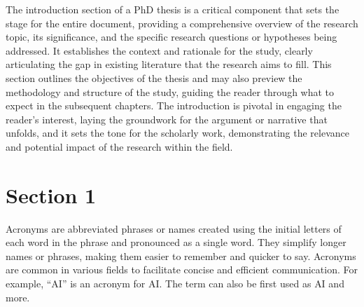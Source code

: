\clearpage
\label{chap:chap001}
\noindent

The introduction section of a PhD thesis is a critical component that sets the stage for the entire document, providing a comprehensive overview of the research topic, its significance, and the specific research questions or hypotheses being addressed.
It establishes the context and rationale for the study, clearly articulating the gap in existing literature that the research aims to fill.
This section outlines the objectives of the thesis and may also preview the methodology and structure of the study, guiding the reader through what to expect in the subsequent chapters.
The introduction is pivotal in engaging the reader's interest, laying the groundwork for the argument or narrative that unfolds, and it sets the tone for the scholarly work, demonstrating the relevance and potential impact of the research within the field.

\section{Section 1}
\label{sec:chap001001}

Acronyms are abbreviated phrases or names created using the initial letters of each word in the phrase and pronounced as a single word.
They simplify longer names or phrases, making them easier to remember and quicker to say.
Acronyms are common in various fields to facilitate concise and efficient communication.
For example, ``\acs{AI}'' is an acronym for \acl{AI}.
The term can also be first used as \ac{AI} and more.

